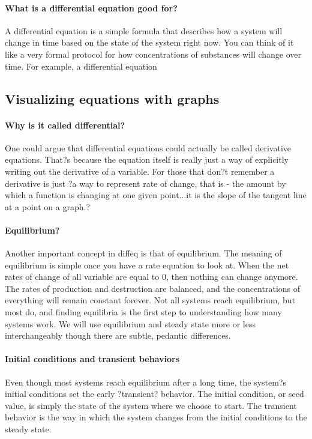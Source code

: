 \paragraph{What is a differential equation good for?} A differential equation is a simple formula that describes how a system will change in time based on the state of the system right now. You can think of it like a very formal protocol for how concentrations of substances will change over time.  For example, a differential equation 

% 



\subsection{Visualizing equations with graphs}
\paragraph{Why is it called differential?} One could argue that differential equations could actually be called derivative equations.  That?s because the equation itself is really just a way of explicitly writing out the derivative of a variable.  For those that don?t remember a derivative is just ?a way to represent rate of change, that is - the amount by which a function is changing at one given point...it is the slope of the tangent line at a point on a graph.?

\paragraph{Equilibrium?} Another important concept in diffeq is that of equilibrium.  The meaning of equilibrium is simple once you have a rate equation to look at.  When the net rates of change of all variable are equal to 0, then nothing can change anymore.  The rates of production and destruction are balanced, and the concentrations of everything will remain constant forever.  Not all systems reach equilibrium, but most do, and finding equilibria is the first step to understanding how many systems work.  We will use equilibrium and steady state more or less interchangeably though there are subtle, pedantic differences.

\paragraph{Initial conditions and transient behaviors} Even though most systems reach equilibrium after a long time, the system?s initial conditions set the early ?transient? behavior. The initial condition, or seed value, is simply the state of the system where we choose to start.  The transient behavior is the way in which the system changes from the initial conditions to the steady state.

